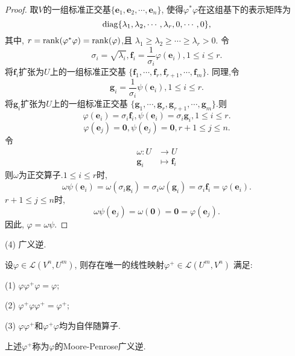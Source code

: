 \begin{proof}
  取$V$的一组标准正交基$\{\bm{e}_1,\bm{e}_2,\cdots,\bm{e}_n\}$,
  使得$\varphi^*\varphi$在这组基下的表示矩阵为
  \[
    \operatorname{diag}\{\lambda_1,\lambda_2,\cdots,\lambda_r,0,\cdots,0\},
  \]
  其中, $r=\operatorname{rank}(\varphi^*\varphi)=\operatorname{rank}(\varphi)$,且
  $\lambda_1\geq \lambda_2 \geq \cdots \geq \lambda_r >0$.
  令
  \[
    \sigma_i=\sqrt{\lambda_i}, \bm{f}_i=\frac{1}{\sigma_i}\varphi(\bm{e}_i),
    1\leq i \leq r.
  \]
  将$\bm{f}_i$扩张为$U$上的一组标准正交基
  $\{\bm{f}_1,\cdots,\bm{f}_r,\bm{f}_{r+1},\cdots,\bm{f}_m\}$.
  同理,令
  \[
    \bm{g}_i=\frac{1}{\sigma_i}\psi(\bm{e}_i), 1\leq i \leq r.
  \]
  将$\bm{g}_i$扩张为$U$上的一组标准正交基
  $\{\bm{g}_1,\cdots,\bm{g}_r,\bm{g}_{r+1},\cdots,\bm{g}_m\}$.则
  \[
    \varphi(\bm{e}_i)=\sigma_i\bm{f}_i,
    \psi(\bm{e}_i)=\sigma_i\bm{g}_i,
    1\leq i \leq r.
  \]
  \[
    \varphi(\bm{e}_j)=\bm{0}, \psi(\bm{e}_j)=\bm{0},
    r+1\leq j \leq n.
  \]
  令
  \begin{align*}
    \omega: U & \to U\\
    \bm{g}_i & \mapsto \bm{f}_i
  \end{align*}
  则$\omega$为正交算子.$1\leq i \leq r$时,
  \[
    \omega\psi(\bm{e}_i)=\omega(\sigma_i\bm{g}_i)=\sigma_i\omega(\bm{g}_i)=
    \sigma_i\bm{f}_i=\varphi(\bm{e}_i).
  \]
  $r+1\leq j \leq n$时,
  \[
    \omega\psi(\bm{e}_j)=\omega(\bm{0})=\bm{0}=\varphi(\bm{e}_j).
  \]
  因此, $\varphi=\omega\psi$.
\end{proof}

(4) 广义逆.

\begin{theorem}\label{thm:SVD3}
  设$\varphi\in\mathscr{L}(V^n,U^m)$,
  则存在唯一的线性映射$\varphi^+\in\mathscr{L}(U^m,V^n)$
  满足:

  (1) $\varphi\varphi^+\varphi=\varphi$;

  (2) $\varphi^+\varphi\varphi^+=\varphi^+$;

  (3) $\varphi\varphi^+$和$\varphi^+\varphi$均为自伴随算子.

  上述$\varphi^+$称为$\varphi$的Moore-Penrose广义逆.
\end{theorem}

